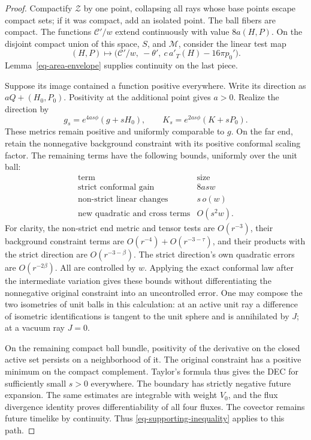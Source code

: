 \begin{proof}
Compactify \(\mathcal Z\) by one point, collapsing all rays whose base
points escape compact sets; if it was compact, add an isolated point.
The ball fibers are compact.  The functions \(\mathcal C'/w\) extend
continuously with value \(8a(H,P)\).  On the disjoint compact union of
this space, \(S\), and \(\mathcal M\), consider the linear test map
\begin{equation}
 (H,P)\longmapsto
 \big(\mathcal C'/w,\ -\theta',\
          c\,a'_T(H)-16\pi p_0'\big).
 \label{eq-test-map}
\end{equation}
Lemma~\ref{eq-area-envelope} supplies continuity on the last piece.

Suppose its image contained a function positive everywhere.  Write its
direction as \(aQ+(H_0,P_0)\).  Positivity at the additional point gives
\(a>0\).  Realize the direction by
\[
 g_s=e^{4as\phi}(g+sH_0),\qquad
 K_s=e^{2as\phi}(K+sP_0).
\]
These metrics remain positive and uniformly comparable to \(g\).
On the far end, retain the nonnegative background constraint with its
positive conformal scaling factor.  The remaining terms have the
following bounds, uniformly over the unit ball:
\[
 \begin{array}{c|c}
 \text{term}&\text{size}\\ \hline
 \text{strict conformal gain}&8asw\\
 \text{non-strict linear changes}&s\,o(w)\\
 \text{new quadratic and cross terms}&O(s^2w).
 \end{array}
\]
For clarity, the non-strict end metric and tensor tests are
\(O(r^{-3})\), their background constraint terms are
\(O(r^{-4})+O(r^{-3-\tau})\), and their products with the strict
direction are \(O(r^{-3-\beta})\).  The strict direction's own
quadratic errors are \(O(r^{-2\beta})\).  All are controlled by
\(w\).  Applying the exact conformal law after the intermediate
variation gives these bounds without differentiating the
nonnegative original constraint into an uncontrolled error.
One may compose the two isometries of unit balls in this calculation:
at an active unit ray a difference of isometric identifications is
tangent to the unit sphere and is annihilated by \(J\); at a vacuum
ray \(J=0\).

On the remaining compact ball bundle, positivity of the derivative
on the closed active set persists on a neighborhood of it.  The
original constraint has a positive minimum on the compact complement.
Taylor's formula thus gives the DEC for sufficiently small \(s>0\)
everywhere.  The boundary has strictly negative future expansion.
The same estimates are integrable with weight \(V_0\), and the flux
divergence identity proves differentiability of all four fluxes.
The covector remains future timelike by continuity.  Thus
\eqref{eq-supporting-inequality} applies to this path.


\end{proof}
